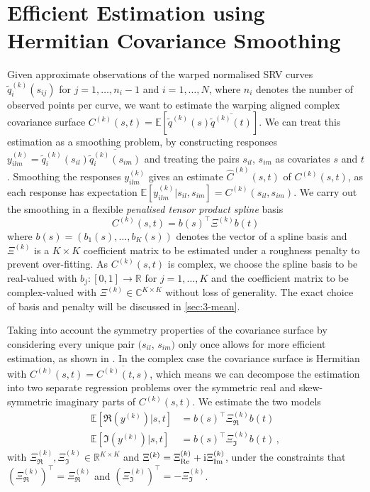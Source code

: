 \section{Efficient Estimation using Hermitian Covariance Smoothing}
\label{sec:3-cov}
Given approximate observations of the warped normalised SRV curves $\widetilde q^{(k)}_i(s_{ij})$ for $j = 1,\dots,n_i-1$ and $i=1,\dots,N$, where $n_i$ denotes the number of observed points per curve, we want to estimate the warping aligned complex covariance surface $C^{(k)}(s,t) = \mathbb{E}[\widetilde q^{(k)}(s)\overline{\widetilde q^{(k)}(t)}]$.
We can treat this estimation as a smoothing problem, by constructing responses $y^{(k)}_{ilm} = \widetilde q^{(k)}_i(s_{il}) \overline{\widetilde q^{(k)}_i(s_{im})}$ and treating the pairs $s_{il}$, $s_{im}$ as covariates $s$ and $t$ \parencite[see][]{YaoMuellerWang2005}.
Smoothing the responses $y^{(k)}_{ilm}$ gives an estimate $\hat C^{(k)}(s,t)$ of $C^{(k)}(s,t)$, as each response has expectation $\mathbb{E}[y^{(k)}_{ilm}|s_{il},s_{im}] = C^{(k)}(s_{il},s_{im})$. 
We carry out the smoothing in a flexible \emph{penalised tensor product spline} basis 
\begin{equation}
  C^{(k)}(s,t) = b(s)^\top \Xi^{(k)} b(t) 
\end{equation}
where $b(s) = (b_1(s),\dots,b_K(s))$ denotes the vector of a spline basis and $\Xi^{(k)}$ is a $K \times K$ coefficient matrix to be estimated under a roughness penalty to prevent over-fitting. 
As $C^{(k)}(s,t)$ is complex, we choose the spline basis to be real-valued with $b_j : [0,1] \rightarrow \mathbb{R}$ for $j = 1,\dots,K$ and the coefficient matrix to be complex-valued with $\Xi^{(k)} \in \mathbb{C}^{K \times K}$ without loss of generality.
The exact choice of basis and penalty will be discussed in \cref{sec:3-mean}.

Taking into account the symmetry properties of the covariance surface by considering every unique pair $(s_{il}$, $s_{im})$ only once allows for more efficient estimation, as shown in \cite{CederbaumScheiplGreven2018}. 
In the complex case the covariance surface is Hermitian with $C^{(k)}(s,t) = \overline{C^{(k)}(t,s)}$, which means we can decompose the estimation into two separate regression problems over the symmetric real and skew-symmetric imaginary parts of $C^{(k)}(s,t)$.
We estimate the two models
\begin{align}
  \mathbb{E}[\Re(y^{(k)})|s,t] &= b(s)^\top \Xi^{(k)}_{\Re} b(t) \\
  \mathbb{E}[\Im(y^{(k)})|s,t] &= b(s)^\top \Xi^{(k)}_{\Im} b(t)\,,
\end{align}
with $\Xi^{(k)}_\Re, \Xi^{(k)}_\Im \in \mathbb{R}^{K\times K}$ and $\Xi^{(k)} = \Xi^{(k)}_{\mathrm{Re}} + \mathrm{i}\mkern1mu \Xi^{(k)}_{\mathrm{Im}}$, under the constraints that $(\Xi^{(k)}_\Re)^\top = \Xi^{(k)}_\Re$ and $(\Xi^{(k)}_\Im)^\top = - \Xi^{(k)}_\Im$.

